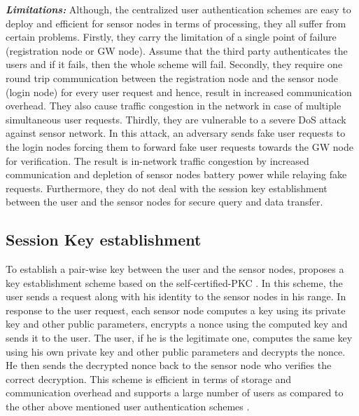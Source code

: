 \documentclass[a4paper,12pt]{report}
\begin{document}
\noindent \textbf{\textit{Limitations:}} Although, the centralized
user authentication schemes are easy to deploy and efficient for
sensor nodes in terms of processing, they all suffer from certain
problems. Firstly, they carry the limitation of a single point of
failure (registration node or GW node). Assume that the third party
authenticates the users and if it fails, then the whole scheme will
fail. Secondly, they require one round trip communication between
the registration node and the sensor node (login node) for every
user request and hence, result in increased communication overhead.
They also cause traffic congestion in the network in case of
multiple simultaneous user requests. Thirdly, they are vulnerable to
a severe DoS attack against sensor network. In this attack, an
adversary sends fake user requests to the login nodes forcing them
to forward fake user requests towards the GW node for verification.
The result is in-network traffic congestion by increased
communication and depletion of sensor nodes battery power while
relaying fake requests. Furthermore, they do not deal with the
session key establishment between the user and the sensor nodes for
secure query and data transfer.

\subsection{Session Key establishment}
To establish a pair-wise key between the user and the sensor nodes,
\cite{jiang} proposes a key establishment scheme based on the
self-certified-PKC \cite{petersen}. In this scheme, the user sends a
request along with his identity to the sensor nodes in his range. In
response to the user request, each sensor node computes a key using
its private key and other public parameters, encrypts a nonce using
the computed key and sends it to the user. The user, if he is the
legitimate one, computes the same key using his own private key and
other public parameters and decrypts the nonce. He then sends the
decrypted nonce back to the sensor node who verifies the correct
decryption. This scheme is efficient in terms of storage and
communication overhead and supports a large number of users as
compared to the other above mentioned user authentication
schemes \cite{yasmin}.\\
\end{document}
